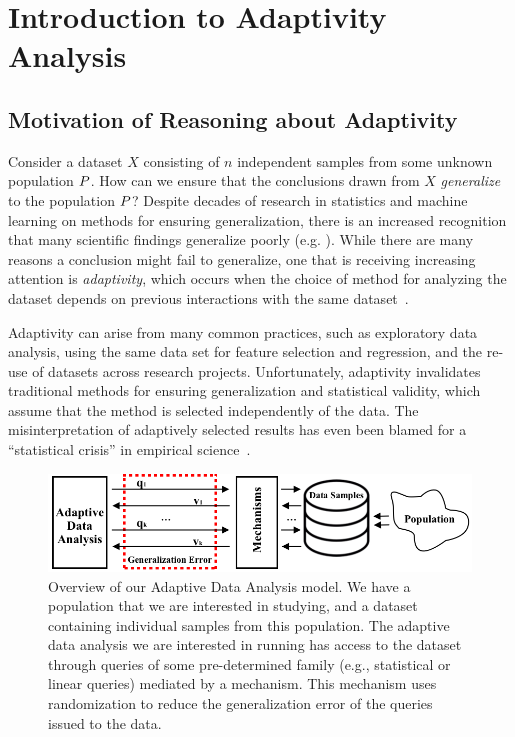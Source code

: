 \chapter{Introduction to Adaptivity Analysis}
\label{introduction}



\section{Motivation of Reasoning about Adaptivity}
% 
Consider a dataset $X$ consisting of $n$ independent samples from some unknown population $P$.  How can we ensure that the conclusions drawn from $X$ \emph{generalize} to the population $P$?  Despite decades of research in statistics and machine learning on methods for ensuring generalization, there is an increased recognition that many scientific findings generalize poorly (e.g. 
\cite{Ioannidis05,GelmanL13}
).  While there are many reasons a conclusion might fail to generalize, one that is receiving increasing attention is \emph{adaptivity}, which occurs when the choice of method for analyzing the dataset depends on previous interactions with the same dataset~\cite{GelmanL13}.

 Adaptivity can arise from many common practices, such as exploratory data analysis, using the same data set for feature selection and regression, and the re-use of datasets across research projects.  Unfortunately, adaptivity invalidates traditional methods for ensuring generalization and statistical validity, which assume that the method is selected independently of the data. The misinterpretation of adaptively selected results has even been blamed for a ``statistical crisis'' in empirical science~\cite{GelmanL13}.

\begin{figure}
    \centering
    \includegraphics[width=0.7\columnwidth]{figures/data_analysis_model.png}
    \caption{Overview of our Adaptive Data Analysis model. We have a population that we are interested in studying, and a dataset containing individual samples from this population. The adaptive data analysis we are interested in running has access to the dataset through queries of some pre-determined family (e.g., statistical or linear queries) mediated by a mechanism. This mechanism uses randomization to reduce the generalization error of the queries issued to the data.}
    \label{fig:adaptivity-model-overview}
\vspace{-0.5cm}
\end{figure}

